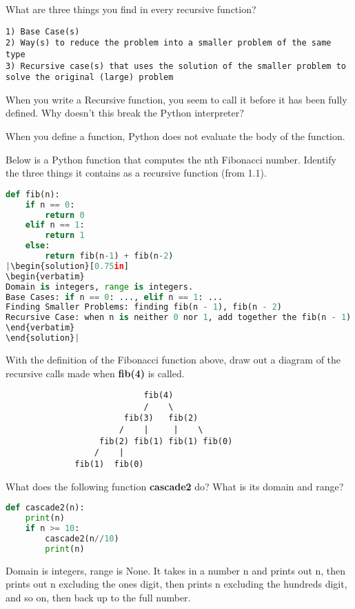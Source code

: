 \question
What are three things you find in every recursive function?
\begin{solution}[0.75in]
\begin{verbatim}
1) Base Case(s)
2) Way(s) to reduce the problem into a smaller problem of the same type
3) Recursive case(s) that uses the solution of the smaller problem to solve the original (large) problem   
\end{verbatim}
\end{solution}

\question
When you write a Recursive function, you seem to call it before it has been fully defined. Why doesn't this break the Python interpreter?
\begin{solution}[0.75in]
When you define a function, Python does not evaluate the body of the function.
\end{solution}

\question
Below is a Python function that computes the nth Fibonacci number. Identify the three things it contains as a recursive function (from 1.1).
\begin{lstlisting}[language=Python]
def fib(n):
    if n == 0:
        return 0
    elif n == 1:
        return 1
    else:
        return fib(n-1) + fib(n-2)
|\begin{solution}[0.75in]
\begin{verbatim}
Domain is integers, range is integers.
Base Cases: if n == 0: ..., elif n == 1: ...
Finding Smaller Problems: finding fib(n - 1), fib(n - 2)
Recursive Case: when n is neither 0 nor 1, add together the fib(n - 1) and fib(n - 2) to find fib(n)
\end{verbatim}
\end{solution}|
\end{lstlisting}

\question
With the definition of the Fibonacci function above, draw out a diagram of the recursive calls made when \textbf{fib(4)} is called.
\begin{solution}[1in]
\begin{verbatim}
                            fib(4)
                            /    \
                        fib(3)   fib(2)
                       /    |     |    \
                   fib(2) fib(1) fib(1) fib(0)
                  /    |
              fib(1)  fib(0)
\end{verbatim}
\end{solution}
\newpage
\question
What does the following function \textbf{cascade2} do? What is its domain and range?
\begin{lstlisting}[language=Python]
def cascade2(n):
    print(n)
    if n >= 10:
        cascade2(n//10)
        print(n)
\end{lstlisting}
\begin{solution}[1in]
Domain is integers, range is None. It takes in a number n and prints out n, then prints out n excluding the ones digit, then prints n excluding the hundreds digit, and so on, then back up to the full number. 
\end{solution}



